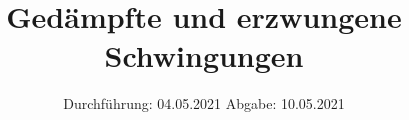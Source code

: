 

\subject{V354}
\title{Gedämpfte und erzwungene Schwingungen}
\date{%
  Durchführung: 04.05.2021
  \hspace{3em}
  Abgabe: 10.05.2021
}



\maketitle
\thispagestyle{empty}
\tableofcontents
\newpage






\printbibliography{}


